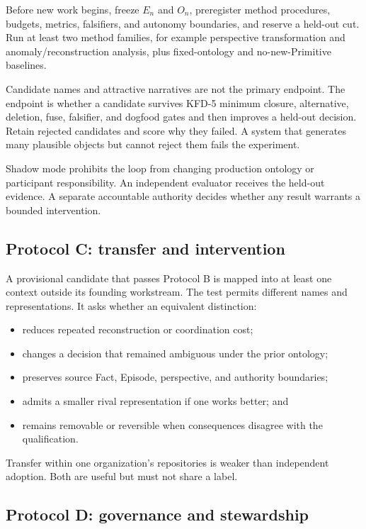 Before new work begins, freeze $E_n$ and $O_n$, preregister method procedures,
budgets, metrics, falsifiers, and autonomy boundaries, and reserve a held-out
cut. Run at least two method families, for example perspective transformation
and anomaly/reconstruction analysis, plus fixed-ontology and no-new-Primitive
baselines.

Candidate names and attractive narratives are not the primary endpoint. The
endpoint is whether a candidate survives KFD-5 minimum closure, alternative,
deletion, fuse, falsifier, and dogfood gates and then improves a held-out
decision. Retain rejected candidates and score why they failed. A system that
generates many plausible objects but cannot reject them fails the experiment.

Shadow mode prohibits the loop from changing production ontology or participant
responsibility. An independent evaluator receives the held-out evidence. A
separate accountable authority decides whether any result warrants a bounded
intervention.

\subsection{Protocol C: transfer and intervention}

A provisional candidate that passes Protocol B is mapped into at least one
context outside its founding workstream. The test permits different names and
representations. It asks whether an equivalent distinction:

\begin{itemize}[leftmargin=*]
  \item reduces repeated reconstruction or coordination cost;
  \item changes a decision that remained ambiguous under the prior ontology;
  \item preserves source Fact, Episode, perspective, and authority boundaries;
  \item admits a smaller rival representation if one works better; and
  \item remains removable or reversible when consequences disagree with the
        qualification.
\end{itemize}

Transfer within one organization's repositories is weaker than independent
adoption. Both are useful but must not share a label.

\subsection{Protocol D: governance and stewardship}

